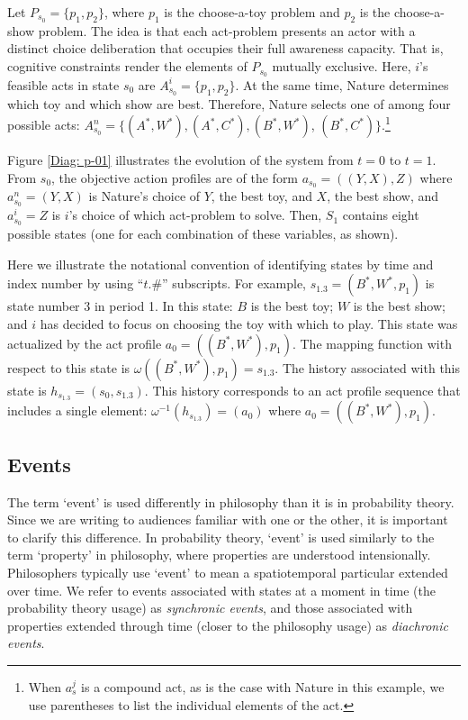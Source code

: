 \documentclass[
11pt,
titlepage,
reqno,
]{article}%
\theoremstyle{definition}
\begin{document}
Let $P_{s_0}=\{p_1,p_2\}$, where $p_1$ is the choose-a-toy problem and $p_2$ is the choose-a-show problem.
The idea is that each act-problem presents an actor with a distinct choice deliberation that occupies their full awareness capacity.
That is, cognitive constraints render the elements of $P_{s_0}$ mutually exclusive.
Here, $i$'s feasible acts in state $s_0$ are  $A^i_{s_0}=\{p_1,p_2\}$.
At the same time, Nature determines which toy and which show are best.
Therefore, Nature selects one of among four possible acts: $A^n_{s_0}=\{(A^\ast,W^\ast),(A^\ast,C^\ast),(B^\ast,W^\ast)$, $(B^\ast,C^\ast)\}$.\footnote
{
	When $a^j_s$ is a compound act, as is the case with Nature in this example, we use parentheses to list the individual elements of the act.
}

Figure \ref{Diag: p-01} illustrates the evolution of the system from $t=0$ to $t=1$. 
From $s_0$, the objective action profiles are of the form $a_{s_0}=((Y,X),Z)$ where $a^n_{s_0}=(Y,X)$ is Nature's choice of  $Y$, the best toy, and $X$, the best show, and $a^i_{s_0}=Z$ is $i$'s choice of which act-problem to solve.
Then, $S_1$ contains eight possible states (one for each combination of these variables, as shown).

Here we illustrate the notational convention of identifying states by time and index number by using ``$t.\#$'' subscripts.
For example, $s_{1.3}=(B^\ast,W^\ast,p_1)$ is state number 3 in period 1.
In this state: $B$ is the best toy; $W$ is the best show; and $i$ has decided to focus on choosing the toy with which to play.
This state was actualized by the act profile $a_0=((B^\ast,W^\ast),p_1)$.
The mapping function with respect to this state is $\omega((B^\ast,W^\ast),p_1)=s_{1.3}$.
The history associated with this state is $h_{s_{1.3}}=(s_0,s_{1.3})$.
This history corresponds to an act profile  sequence that includes a single element:  $\omega^{-1}(h_{s_{1.3}})=(a_0)$ where $a_0=((B^\ast,W^\ast),p_1)$.
	
	
\subsection{Events}

The term `event' is used differently in philosophy than it is in probability theory. 
Since we are writing to audiences familiar with one or the other, it is important to clarify this difference. 
In probability theory, `event' is used similarly to the term `property' in philosophy, where properties are understood intensionally. 
Philosophers typically use `event' to mean a spatiotemporal particular extended over time. 
We refer to events associated with states at a moment in time (the probability theory usage) as \textit{synchronic events}, and those associated with properties extended through time (closer to the philosophy usage) as \textit{diachronic events}.
\end{document}
